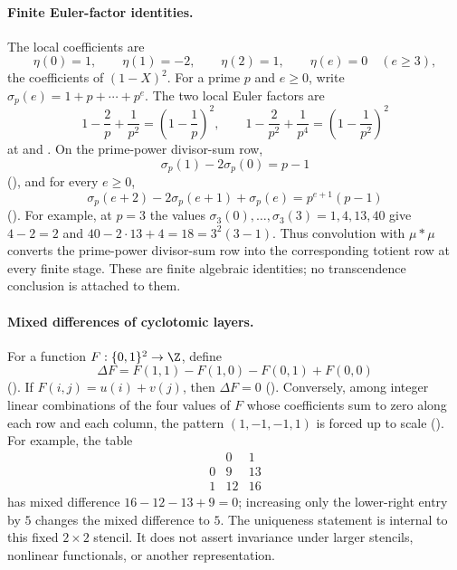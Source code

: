 \paragraph{Finite Euler-factor identities.}
The local coefficients are
\[
  \eta(0)=1,\qquad \eta(1)=-2,\qquad \eta(2)=1,\qquad
  \eta(e)=0\quad(e\ge3),
\]
the coefficients of $(1-X)^2$.  For a prime $p$ and $e\ge0$, write
$\sigma_p(e)=1+p+\cdots+p^e$.  The two local Euler factors are
\[
  1-\frac2p+\frac1{p^2}=\left(1-\frac1p\right)^2,
  \qquad
  1-\frac2{p^2}+\frac1{p^4}
      =\left(1-\frac1{p^2}\right)^2
\]
at
and
.
On the prime-power divisor-sum row,
\[
  \sigma_p(1)-2\sigma_p(0)=p-1
\]
(),
and for every $e\ge0$,
\[
  \sigma_p(e+2)-2\sigma_p(e+1)+\sigma_p(e)
    =p^{e+1}(p-1)
\]
().
For example, at $p=3$ the values
$\sigma_3(0),\ldots,\sigma_3(3)=1,4,13,40$ give
$4-2=2$ and $40-2\cdot13+4=18=3^2(3-1)$.  Thus convolution with
$\mu\ast\mu$ converts the prime-power divisor-sum row into the corresponding
totient row at every finite stage.  These are finite algebraic identities; no
transcendence conclusion is attached to them.

\paragraph{Mixed differences of cyclotomic layers.}
For a function $F:\{0,1\}^2\to\Z$, define
\[
  \Delta F=F(1,1)-F(1,0)-F(0,1)+F(0,0)
\]
().
If $F(i,j)=u(i)+v(j)$, then $\Delta F=0$
().
Conversely, among integer linear combinations of the four values of $F$ whose
coefficients sum to zero along each row and each column, the pattern
$(1,-1,-1,1)$ is forced up to scale
().
For example, the table
\[
\begin{array}{c|cc}
 &0&1\\ \hline
0&9&13\\
1&12&16
\end{array}
\]
has mixed difference $16-12-13+9=0$; increasing only the lower-right entry by
$5$ changes the mixed difference to $5$.  The uniqueness statement is
internal to this fixed $2\times2$ stencil.  It does not assert invariance under
larger stencils, nonlinear functionals, or another representation.

